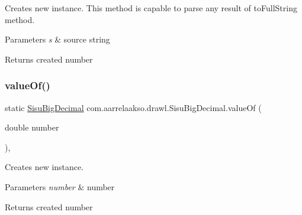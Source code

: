 Creates new instance. This method is capable to parse any result of to\+Full\+String method.


\begin{DoxyParams}{Parameters}
{\em s} & source string \\
\hline
\end{DoxyParams}
\begin{DoxyReturn}{Returns}
created number 
\end{DoxyReturn}
\mbox{\label{classcom_1_1aarrelaakso_1_1drawl_1_1_sisu_big_decimal_abdd37c9d8ee68f034fc15ca6777a1de7}} 
\subsubsection{\texorpdfstring{value\+Of()}{valueOf()}\hspace{0.1cm}{\footnotesize\ttfamily [2/4]}}
{\footnotesize\ttfamily static \hyperlink{classcom_1_1aarrelaakso_1_1drawl_1_1_sisu_big_decimal}{Sisu\+Big\+Decimal} com.\+aarrelaakso.\+drawl.\+Sisu\+Big\+Decimal.\+value\+Of (\begin{DoxyParamCaption}\item[{double}]{number }\end{DoxyParamCaption})\hspace{0.3cm}{\ttfamily [static]}, {\ttfamily [protected]}}

Creates new instance.


\begin{DoxyParams}{Parameters}
{\em number} & number \\
\hline
\end{DoxyParams}
\begin{DoxyReturn}{Returns}
created number 
\end{DoxyReturn}
\mbox{\label{classcom_1_1aarrelaakso_1_1drawl_1_1_sisu_big_decimal_a251d1a42f8906fe5b7da6981673464d2}} 
